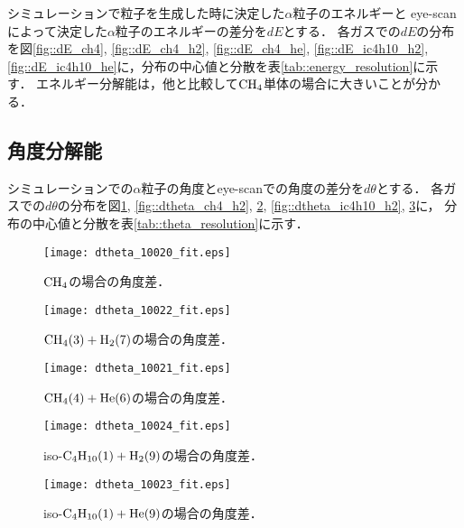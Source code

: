 \documentclass[../master]{subfiles}
\begin{document}
シミュレーションで粒子を生成した時に決定した$\alpha$粒子のエネルギーと
eye-scanによって決定した$\alpha$粒子のエネルギーの差分を$dE$とする．
各ガスでの$dE$の分布を図\ref{fig::dE_ch4}, \ref{fig::dE_ch4_h2}, \ref{fig::dE_ch4_he},
\ref{fig::dE_ic4h10_h2}, \ref{fig::dE_ic4h10_he}に，分布の中心値と分散を表\ref{tab::energy_resolution}に示す．
エネルギー分解能は，他と比較して$\rm CH_{4}$単体の場合に大きいことが分かる．

\subsection{角度分解能}
シミュレーションでの$\alpha$粒子の角度とeye-scanでの角度の差分を$d\theta$とする．
各ガスでの$d\theta$の分布を図\ref{fig::dtheta_ch4}, \ref{fig::dtheta_ch4_h2}, \ref{fig::dtheta_ch4_he},
\ref{fig::dtheta_ic4h10_h2}, \ref{fig::dtheta_ic4h10_he}に，
分布の中心値と分散を表\ref{tab::theta_resolution}に示す．
\begin{figure}
  \centering
  \begin{minipage}{0.45\columnwidth}
    \centering
    \texttt{[image: dtheta\_10020\_fit.eps]}
    \caption{$\rm CH_{4}$の場合の角度差．}
    \label{fig::dtheta_ch4}
  \end{minipage}  
\end{figure}
\begin{figure}
  \centering
  \begin{minipage}{0.45\columnwidth}
    \centering
    \texttt{[image: dtheta\_10022\_fit.eps]}
    \caption{$\rm CH_{4} (3) + H_{2} (7)$の場合の角度差．}
    \label{fig::dtheta_ch4_h2}
  \end{minipage}
  \begin{minipage}{0.45\columnwidth}
    \centering
    \texttt{[image: dtheta\_10021\_fit.eps]}
    \caption{$\rm CH_{4} (4) + He (6)$の場合の角度差．}
    \label{fig::dtheta_ch4_he}
  \end{minipage}
\end{figure}
\begin{figure}
  \centering
  \begin{minipage}{0.45\columnwidth}
    \centering
    \texttt{[image: dtheta\_10024\_fit.eps]}
    \caption{iso-$\rm C_{4}H_{10} (1) + H_{2} (9)$の場合の角度差．}
    \label{fig::dtheta_ic4h10_h2}
  \end{minipage}
  \begin{minipage}{0.45\columnwidth}
    \centering
    \texttt{[image: dtheta\_10023\_fit.eps]}
    \caption{iso-$\rm C_{4}H_{10} (1) + He (9)$の場合の角度差．}
    \label{fig::dtheta_ic4h10_he}
  \end{minipage}
\end{figure}
\end{document}
